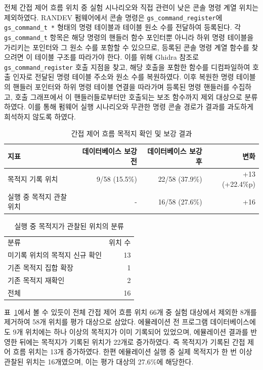 \documentclass[master,korean,final]{kaist-ucs}
\begin{document}
전체 간접 제어 흐름 위치 중 실험 시나리오와 직접 관련이 낮은 콘솔 명령 계열 위치는 제외하였다. RANDEV 펌웨어에서 콘솔 명령은 \texttt{gs\_command\_register}에 \texttt{gs\_command\_t *} 형태의 명령 테이블과 테이블 원소 수를 전달하여 등록된다. 각 \texttt{gs\_command\_t} 항목은 해당 명령의 핸들러 함수 포인터뿐 아니라 하위 명령 테이블을 가리키는 포인터와 그 원소 수를 포함할 수 있으므로, 등록된 콘솔 명령 계열 함수를 찾으려면 이 테이블 구조를 따라가야 한다. 이를 위해 Ghidra 참조로 \texttt{gs\_command\_register} 호출 지점을 찾고, 해당 호출을 포함한 함수를 디컴파일하여 호출 인자로 전달된 명령 테이블 주소와 원소 수를 복원하였다. 이후 복원한 명령 테이블의 핸들러 포인터와 하위 명령 테이블 연결을 따라가며 등록된 명령 핸들러를 수집하고, 호출 그래프에서 이 핸들러들로부터만 호출되는 보조 함수까지 제외 대상으로 분류하였다. 이를 통해 펌웨어 실행 시나리오와 무관한 명령 콘솔 경로가 결과를 과도하게 희석하지 않도록 하였다.

\begin{table}[t]
\caption{간접 제어 흐름 목적지 확인 및 보강 결과}
\label{tab:indirect-flow-coverage}
\begin{center}
\begin{tabular}{lrrr}
\hline\hline
지표 & 데이터베이스 보강 전 & 데이터베이스 보강 후 & 변화 \\
\hline
목적지 기록 위치 & 9/58 (15.5\%) & 22/58 (37.9\%) & +13 (+22.4\%p) \\
실행 중 목적지 관찰 위치 & - & 16/58 (27.6\%) & +16 \\
\hline\hline
\end{tabular}
\end{center}
\end{table}

\begin{table}[t]
\caption{실행 중 목적지가 관찰된 위치의 분류}
\label{tab:observed-indirect-flows}
\begin{center}
\begin{tabular}{lr}
\hline\hline
분류 & 위치 수 \\
미기록 위치의 목적지 신규 확인 & 13 \\
기존 목적지 집합 확장 & 1 \\
기존 목적지 재확인 & 2 \\
전체 & 16 \\
\hline\hline
\end{tabular}
\end{center}
\end{table}

표~\ref{tab:indirect-flow-coverage}에서 볼 수 있듯이 전체 간접 제어 흐름 위치 66개 중 실험 대상에서 제외한 8개를 제거하여 58개 위치를 평가 대상으로 삼았다. 에뮬레이션 전 프로그램 데이터베이스에도 9개 위치에는 하나 이상의 목적지가 이미 기록되어 있었으며, 에뮬레이션 결과를 반영한 뒤에는 목적지가 기록된 위치가 22개로 증가하였다. 즉 목적지가 기록된 간접 제어 흐름 위치는 13개 증가하였다. 한편 에뮬레이션 실행 중 실제 목적지가 한 번 이상 관찰된 위치는 16개였으며, 이는 평가 대상의 27.6\%에 해당한다.
\end{document}
